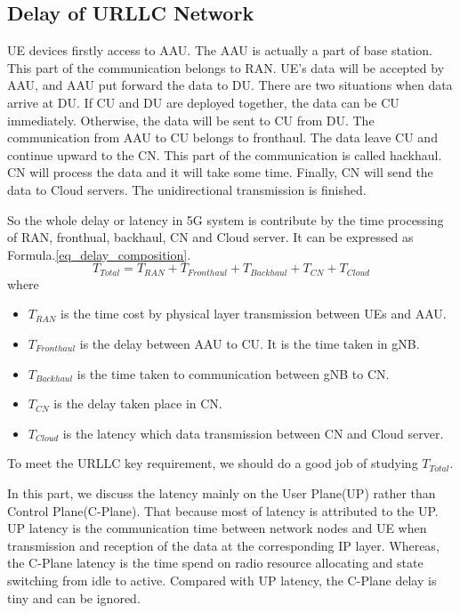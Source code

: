 \documentclass[conference]{IEEEtran}
\begin{document}
\subsection{Delay of URLLC Network}
UE devices firstly access to AAU. The AAU is actually a part of base station. This part of the communication belongs to RAN.
UE's data will be accepted by AAU, and AAU put forward the data to DU.
There are two situations when data arrive at DU.
If CU and DU are deployed together, the data can be CU immediately. Otherwise, the data will be sent to CU from DU.
The communication from AAU to CU belongs to fronthaul.
The data leave CU and continue upward to the CN. This part of the communication is called hackhaul.
CN will process the data and it will take some time.
Finally, CN will send the data to Cloud servers. The unidirectional transmission is finished.

So the whole delay or latency in 5G system is contribute by the time processing of RAN, fronthual, backhaul, CN and Cloud server. It can be expressed as Formula.\ref{eq_delay_composition}.
\begin{equation}\label{eq_delay_composition}
T_{Total} = T_{RAN} + T_{Fronthaul} + T_{Backhaul} + T_{CN} + T_{Cloud}
\end{equation}
where
\begin{itemize}
\item $T_{RAN}$ is the time cost by physical layer transmission between UEs and AAU.
\item $T_{Fronthaul}$ is the delay between AAU to CU. It is the time taken in gNB.
\item $T_{Backhaul}$ is the time taken to communication between gNB to CN.
\item $T_{CN}$ is the delay taken place in CN.
\item $T_{Cloud}$ is the latency which data transmission between CN and Cloud server.
\end{itemize}

To meet the URLLC key requirement, we should do a good job of studying $T_{Total}$.

In this part, we discuss the latency mainly on the User Plane(UP) rather than Control Plane(C-Plane). That because most of latency is attributed to the UP. UP latency is the communication time between network nodes and UE when transmission and reception of the data at the corresponding IP layer. Whereas, the C-Plane latency is the time spend on radio resource allocating and state switching from idle to active. Compared with UP latency, the C-Plane delay is tiny and can be ignored.
\end{document}
